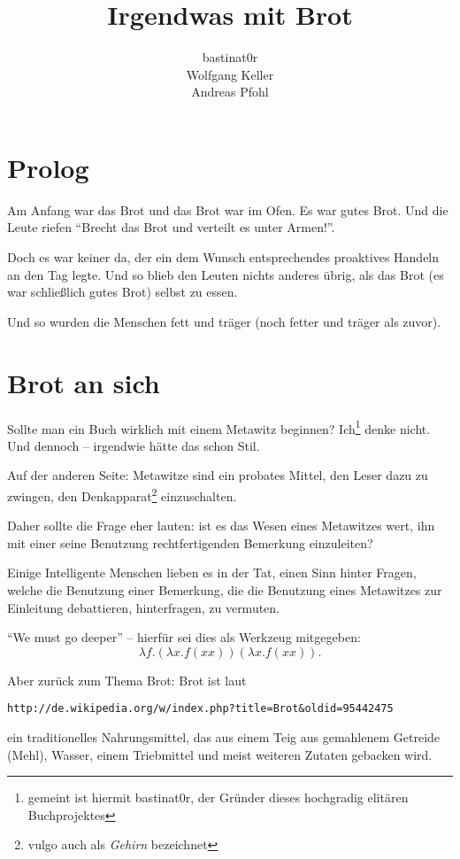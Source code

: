 \documentclass{scrbook}
\title{Irgendwas mit Brot}
\author{bastinat0r \\ Wolfgang Keller \\ Andreas Pfohl}
\begin{document}
\maketitle

\chapter*{Prolog}

Am Anfang war das Brot und das Brot war im Ofen. Es war gutes Brot. Und die Leute riefen "`Brecht das Brot und verteilt es unter Armen!"'.


Doch es war keiner da, der ein dem Wunsch entsprechendes proaktives Handeln an den Tag legte. Und so blieb den Leuten nichts anderes übrig, als das Brot (es war schließlich gutes Brot) selbst zu essen.

Und so wurden die Menschen fett und träger (noch fetter und träger als zuvor).

\chapter{Brot an sich}

Sollte man ein Buch wirklich mit einem Metawitz beginnen? Ich\footnote{gemeint ist hiermit bastinat0r, der Gründer dieses hochgradig elitären Buchprojektes} denke nicht. Und dennoch – irgendwie hätte das schon Stil.

Auf der anderen Seite: Metawitze sind ein probates Mittel, den Leser dazu zu zwingen, den Denkapparat\footnote{vulgo auch als \emph{Gehirn} bezeichnet} einzuschalten.

Daher sollte die Frage eher lauten: ist es das Wesen eines Metawitzes wert, ihn mit einer seine Benutzung rechtfertigenden Bemerkung einzuleiten?

Einige Intelligente Menschen lieben es in der Tat, einen Sinn hinter Fragen, welche die Benutzung einer Bemerkung, die die Benutzung eines Metawitzes zur Einleitung debattieren, hinterfragen, zu vermuten.

"`We must go deeper"' -- hierfür sei dies als Werkzeug mitgegeben:
\begin{displaymath}
\lambda f.(\lambda x.f (x x)) (\lambda x.f (x x)).
\end{displaymath}
%

Aber zurück zum Thema Brot: Brot ist laut \begin{verbatim}http://de.wikipedia.org/w/index.php?title=Brot&oldid=95442475\end{verbatim} ein traditionelles Nahrungsmittel, das aus einem Teig aus gemahlenem Getreide (Mehl), Wasser, einem Triebmittel und meist weiteren Zutaten gebacken wird.
\end{document}
